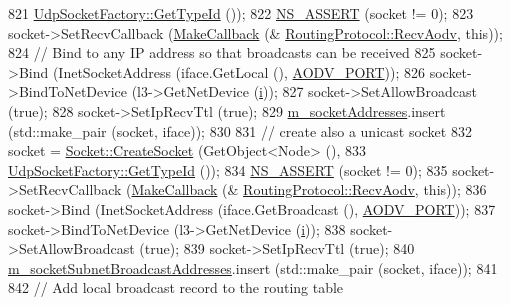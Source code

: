 \begin{DoxyCode}
821                                                      \hyperlink{classns3_1_1UdpSocketFactory_ad5b47e944de8861e3dc2b6de1ccbdf5b}{UdpSocketFactory::GetTypeId}
       ());
822           \hyperlink{assert_8h_a6dccdb0de9b252f60088ce281c49d052}{NS\_ASSERT} (socket != 0);
823           socket->SetRecvCallback (\hyperlink{group__makecallbackmemptr_ga9376283685aa99d204048d6a4b7610a4}{MakeCallback} (&
      \hyperlink{classns3_1_1aodv_1_1RoutingProtocol_a08c44000f66533e69bde85d68d75c354}{RoutingProtocol::RecvAodv}, \textcolor{keyword}{this}));
824           \textcolor{comment}{// Bind to any IP address so that broadcasts can be received}
825           socket->Bind (InetSocketAddress (iface.GetLocal (), \hyperlink{classns3_1_1aodv_1_1RoutingProtocol_ac4a3de99b49ad5f6efc9b71a700f7ec4}{AODV\_PORT}));
826           socket->BindToNetDevice (l3->GetNetDevice (\hyperlink{bernuolliDistribution_8m_a6f6ccfcf58b31cb6412107d9d5281426}{i}));
827           socket->SetAllowBroadcast (\textcolor{keyword}{true});
828           socket->SetIpRecvTtl (\textcolor{keyword}{true});
829           \hyperlink{classns3_1_1aodv_1_1RoutingProtocol_aa3263563cbbd735faafbf17fd4e28a10}{m\_socketAddresses}.insert (std::make\_pair (socket, iface));
830 
831           \textcolor{comment}{// create also a unicast socket}
832           socket = \hyperlink{classns3_1_1Socket_ad448a62bb50ad3dbac59c879a885a8d2}{Socket::CreateSocket} (GetObject<Node> (),
833                                                        
      \hyperlink{classns3_1_1UdpSocketFactory_ad5b47e944de8861e3dc2b6de1ccbdf5b}{UdpSocketFactory::GetTypeId} ());
834           \hyperlink{assert_8h_a6dccdb0de9b252f60088ce281c49d052}{NS\_ASSERT} (socket != 0);
835           socket->SetRecvCallback (\hyperlink{group__makecallbackmemptr_ga9376283685aa99d204048d6a4b7610a4}{MakeCallback} (&
      \hyperlink{classns3_1_1aodv_1_1RoutingProtocol_a08c44000f66533e69bde85d68d75c354}{RoutingProtocol::RecvAodv}, \textcolor{keyword}{this}));
836           socket->Bind (InetSocketAddress (iface.GetBroadcast (), \hyperlink{classns3_1_1aodv_1_1RoutingProtocol_ac4a3de99b49ad5f6efc9b71a700f7ec4}{AODV\_PORT}));
837           socket->BindToNetDevice (l3->GetNetDevice (\hyperlink{bernuolliDistribution_8m_a6f6ccfcf58b31cb6412107d9d5281426}{i}));
838           socket->SetAllowBroadcast (\textcolor{keyword}{true});
839           socket->SetIpRecvTtl (\textcolor{keyword}{true});
840           \hyperlink{classns3_1_1aodv_1_1RoutingProtocol_a3516a9ee6cc1a0ebde0fdc08680dc7c4}{m\_socketSubnetBroadcastAddresses}.insert (std::make\_pair (socket, 
      iface));
841 
842           \textcolor{comment}{// Add local broadcast record to the routing table}

\end{DoxyCode}
